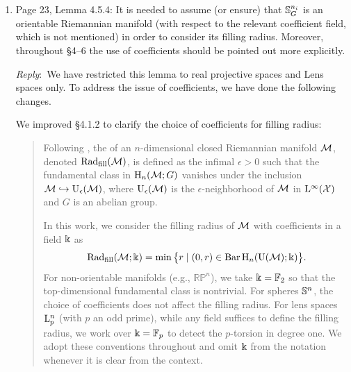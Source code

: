 \documentclass{amsart}
\newcommand{\ar}{\medskip\noindent\textit{Reply}:\ }
\begin{document}
\begin{enumerate}
		\ar We spelled out the proof of this fact with relevant refereces to Hatcher.
		It now reads:

		\medskip
		\begin{quote}
			Because the \(\cyc_2\)-action is proper and free, the quotient maps to the orbit spaces are covering space projections \cite[Prop.~1.40]{hatcher2000}.
			These projections induce isomorphisms on \(\pi_k\) for \(k \ge 2\) \cite[Prop.~4.1]{hatcher2000}, which, combined with the \(\cyc_2\)-equivariance of $f_r^n$, forces the induced map on the orbit spaces to also be an isomorphism for \(k \ge 2\).
			For \(k=1\), a diagram chase in the short exact sequences of groups of the covering spaces ensures an isomorphism on fundamental groups.
			Together with a natural bijection on path components, this establishes that the induced map on the orbit spaces is a weak equivalence.
		\end{quote}

		\item Page 23, Lemma 4.5.4: It is needed to assume (or ensure) that $\mathbb{S}^{n_i}_G$ is an orientable Riemannian manifold (with respect to the relevant coefficient field, which is not mentioned) in order to consider its filling radius. Moreover, throughout \S4--6 the use of coefficients should be pointed out more explicitly.

		\ar We have restricted this lemma to real projective spaces and Lens spaces only. To address the issue of coefficients, we have done the following changes.

		We improved \S4.1.2 to clarify the choice of coefficients for filling radius:

		\smallskip

		\begin{quote}
			Following \cite{gromov1983filling}, the  of an \(n\)-dimensional closed Riemannian manifold \(\mathcal{M}\), denoted \(\mathrm{Rad}_{\mathrm{fill}}(\mathcal{M})\), is defined as the infimal \(\epsilon > 0\) such that the fundamental class in \(\mathrm{H}_n(\mathcal{M}; G)\) vanishes under the inclusion \(\mathcal{M} \hookrightarrow \mathrm{U}_\epsilon(\mathcal{M})\), where \(\mathrm{U}_\epsilon(\mathcal{M})\) is the \(\epsilon\)-neighborhood of \(\mathcal{M}\) in \(\mathrm{L}^\infty(\mathcal{X})\) and $G$ is an abelian group.

			In this work, we consider the filling radius of \(\mathcal{M}\) with coefficients in a field \(\Bbbk\) as
			\[
			\mathrm{Rad}_{\mathrm{fill}}(\mathcal{M};\Bbbk)
			=
			\min \big\{ r \mid (0,r) \in \operatorname{Bar} \mathrm{H}_n(\mathrm{U}(\mathcal{M});\Bbbk) \big\}.
			\]
			For non-orientable manifolds (e.g., \(\mathbb{RP}^n\)), we take \(\Bbbk = {\mathbb{F}_2}\) so that the top-dimensional fundamental class is nontrivial.
			For spheres $\mathbb{S}^n$, the choice of coefficients does not affect the filling radius.
			For lens spaces $\mathrm{L}_p^n$ (with $p$ an odd prime), while any field suffices to define the filling radius, we work over $\Bbbk = {\mathbb{F}_p}$ to detect the $p$-torsion in degree one.
			We adopt these conventions throughout and omit $\Bbbk$ from the notation whenever it is clear from the context.
		\end{quote}


\end{enumerate}
\end{document}
